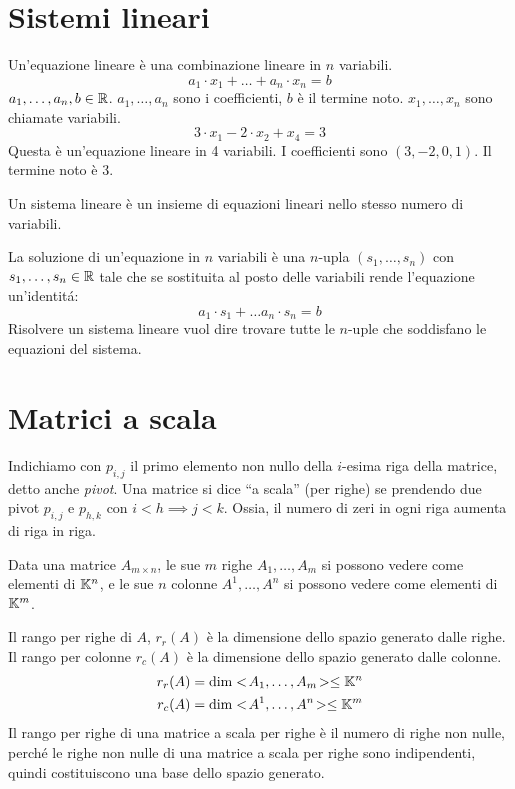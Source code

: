 \section{Sistemi lineari}

Un'equazione lineare \`e una combinazione lineare in $n$ variabili.
\[
a_1 \cdot x_1 + \ldots + a_n \cdot x_n = b
\]
$a_1, \ldots, a_n, b \in \mathbb{R}$. $a_1, \ldots, a_n$ sono i coefficienti, $b$ \`e il termine noto. $x_1, \ldots, x_n$ sono chiamate variabili.
\[
3 \cdot x_1 - 2 \cdot x_2 + x_4 = 3
\]
Questa \`e un'equazione lineare in 4 variabili. I coefficienti sono $(3, -2, 0, 1)$. Il termine noto \`e 3.

Un sistema lineare \`e un insieme di equazioni lineari nello stesso numero di variabili.

La soluzione di un'equazione in $n$ variabili \`e una $n$-upla $(s_1, \ldots, s_n)$ con $s_1, \ldots, s_n \in \mathbb{R}$ tale che se sostituita al posto delle variabili rende l'equazione un'identit\'a:
\[
a_1 \cdot s_1 + \ldots a_n \cdot s_n = b
\]
Risolvere un sistema lineare vuol dire trovare tutte le $n$-uple che soddisfano le equazioni del sistema.

\section{Matrici a scala}

\begin{defn}
Indichiamo con $p_{i,j}$ il primo elemento non nullo della $i$-esima riga della matrice, detto anche \emph{pivot}. Una matrice si dice ``a scala'' (per righe) se prendendo due pivot $p_{i,j}$ e $p_{h,k}$ con $i < h \implies j < k$. Ossia, il numero di zeri in ogni riga aumenta di riga in riga.
\end{defn}
Data una matrice $A_{m \times n}$, le sue $m$ righe $A_1, \ldots, A_m$ si possono vedere come elementi di $\mathbb{K}^n$, e le sue $n$ colonne $A^1, \ldots, A^n$ si possono vedere come elementi di $\mathbb{K}^m$.

Il rango per righe di $A$, $r_r(A)$ \`e la dimensione dello spazio generato dalle righe. Il rango per colonne $r_c(A)$ \`e la dimensione dello spazio generato dalle colonne.
\begin{align*}
r_r (A) &= \dim <\!{A_1, \ldots, A_m}\!> \le \mathbb{K}^n \\
r_c (A) &= \dim <\!{A^1, \ldots, A^n}\!> \le \mathbb{K}^m \\
\end{align*}
Il rango per righe di una matrice a scala per righe \`e il numero di righe non nulle, perch\'e le righe non nulle di una matrice a scala per righe sono indipendenti, quindi costituiscono una base dello spazio generato.

